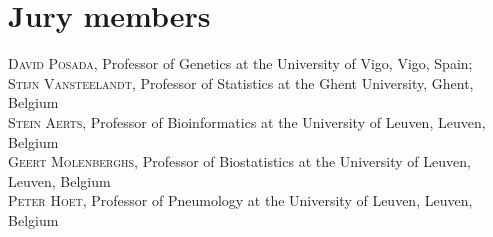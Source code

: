 
\chapter*{Jury members}


\noindent \textsc{David Posada}, Professor of Genetics at the University of Vigo, Vigo, Spain; \\

\noindent \textsc{Stijn Vansteelandt}, Professor of Statistics at the Ghent University, Ghent, Belgium \\

\noindent \textsc{Stein Aerts}, Professor of Bioinformatics at the University of Leuven, Leuven, Belgium \\

\noindent \textsc{Geert Molenberghs}, Professor of Biostatistics at the University of Leuven, Leuven, Belgium \\

\noindent \textsc{Peter Hoet}, Professor of Pneumology at the University of Leuven, Leuven, Belgium \\


